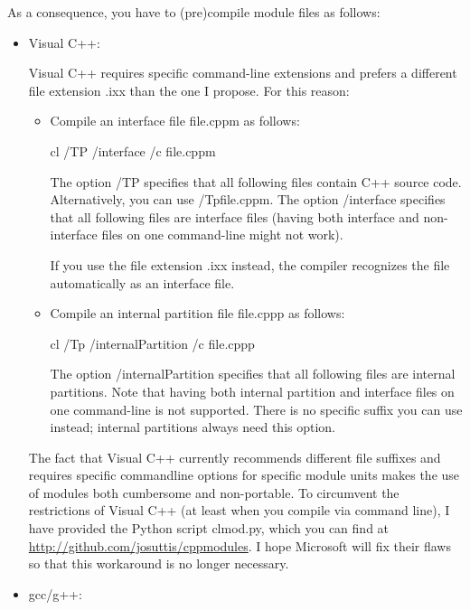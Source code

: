 As a consequence, you have to (pre)compile module files as follows:

\begin{itemize}
\item 
Visual C++:

Visual C++ requires specific command-line extensions and prefers a different file extension .ixx than the one I propose. For this reason:

\begin{itemize}
\item 
Compile an interface file file.cppm as follows:

\begin{shell}
cl /TP /interface /c file.cppm
\end{shell}

The option /TP specifies that all following files contain C++ source code. Alternatively, you can use /Tpfile.cppm. The option /interface specifies that all following files are interface files (having both interface and non-interface files on one command-line might not work).

If you use the file extension .ixx instead, the compiler recognizes the file automatically as an interface file.

\item 
Compile an internal partition file file.cppp as follows:


\begin{shell}
cl /Tp /internalPartition /c file.cppp
\end{shell}

The option /internalPartition specifies that all following files are internal partitions. Note that having both internal partition and interface files on one command-line is not supported. There is no specific suffix you can use instead; internal partitions always need this option.
\end{itemize}

The fact that Visual C++ currently recommends different file suffixes and requires specific commandline options for specific module units makes the use of modules both cumbersome and non-portable. To circumvent the restrictions of Visual C++ (at least when you compile via command line), I have provided the Python script clmod.py, which you can find at \url{http://github.com/josuttis/cppmodules}. I hope Microsoft will fix their flaws so that this workaround is no longer necessary.

\item 
gcc/g++:


\end{itemize}

